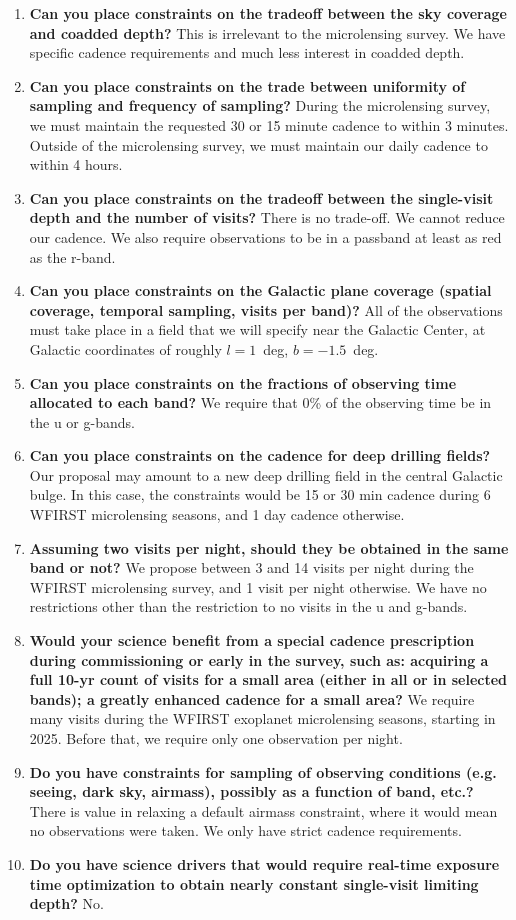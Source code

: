 \begin{enumerate}
\item \textbf{Can you place constraints on the tradeoff between the sky coverage and coadded depth?} This is irrelevant to the microlensing survey. We have specific cadence requirements and much less interest in coadded depth.
\item \textbf{Can you place constraints on the trade between uniformity of sampling and frequency of sampling?} During the microlensing survey, we must maintain the requested 30 or 15 minute cadence to within 3 minutes. Outside of the microlensing survey, we must maintain our daily cadence to within 4 hours.
\item \textbf{Can you place constraints on the tradeoff between the single-visit depth and the number of visits?} There is no trade-off. We cannot reduce our cadence. We also require observations to be in a passband at least as red as the r-band.
\item \textbf{Can you place constraints on the Galactic plane coverage (spatial coverage, temporal sampling, visits per band)?} All of the observations must take place in a field that we will specify near the Galactic Center, at Galactic coordinates of roughly $l = 1$~deg, $b = -1.5$~deg.
\item \textbf{Can you place constraints on the fractions of observing time allocated to each band?} We require that 0\% of the observing time be in the u or g-bands.
\item \textbf{Can you place constraints on the cadence for deep drilling fields?} Our proposal may amount to a new deep drilling field in the central Galactic bulge. In this case, the constraints would be 15 or 30 min cadence during 6 WFIRST microlensing seasons, and 1 day cadence otherwise.
\item \textbf{Assuming two visits per night, should they be obtained in the same band or not?} We propose between 3 and 14 visits per night during the WFIRST microlensing survey, and 1 visit per night otherwise. We have no restrictions other than the restriction to no visits in the u and g-bands.
\item\textbf{ Would your science benefit from a special cadence prescription during commissioning or early in the survey, such as: acquiring a full 10-yr count of visits for a small area (either in all or in selected bands); a greatly enhanced cadence for a small area?} We require many visits during the WFIRST exoplanet microlensing seasons, starting in 2025. Before that, we require only one observation per night.
\item \textbf{Do you have constraints for sampling of observing conditions (e.g. seeing, dark sky, airmass), possibly as a function of band, etc.?} There is value in relaxing a default airmass constraint, where it would mean no observations were taken. We only have strict cadence requirements. 
\item \textbf{Do you have science drivers that would require real-time exposure time optimization to obtain nearly constant single-visit limiting depth?} No.
\end{enumerate}


